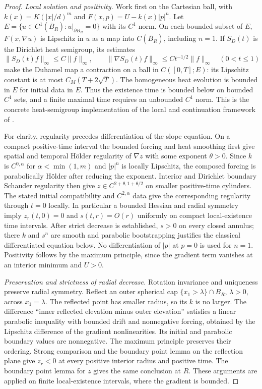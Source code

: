 \documentclass[11pt,a4paper]{article}
\theoremstyle{definition}\newtheorem{definition}[theorem]{Definition}
\theoremstyle{remark}\newtheorem{remark}[theorem]{Remark}
\newcommand{\cl}{\overline}
\begin{document}
\begin{proof}
\emph{Local solution and positivity.} Work first on the Cartesian ball, with $k(x)=K(|x|/d)^m$ and
$F(x,p)=U-k(x)|p|^n$. Let $E=\{u\in C^1(\cl B_R):u|_{\partial B_R}=0\}$
with its $C^1$ norm. On each bounded subset of $E$, $F(x,\nabla u)$ is
Lipschitz in $u$ as a map into $C(\cl B_R)$, including $n=1$.
If $S_D(t)$ is the Dirichlet heat semigroup, its estimates
\[
 \|S_D(t)f\|_\infty\leq C\|f\|_\infty,\qquad
 \|\nabla S_D(t)f\|_\infty\leq C t^{-1/2}\|f\|_\infty
 \quad(0<t\leq1)
\]
make the Duhamel map a contraction on a ball in $C([0,T];E)$:
its Lipschitz constant is at most $C_M(T+2\sqrt T)$.
The homogeneous heat evolution is bounded in $E$ for initial data in $E$.
Thus the existence time is bounded below on bounded $C^1$ sets,
and a finite maximal time requires an unbounded $C^1$ norm.
This is the concrete heat-semigroup implementation of the local and
continuation framework of \cite[Section 3.3]{Henry}.

For clarity, regularity precedes differentiation of the slope equation.
On a compact positive-time interval the bounded forcing and heat smoothing
first give spatial and temporal H\"older regularity of $\nabla z$ with
some exponent $\theta>0$. Since $k$ is $C^{0,\alpha}$ for
$\alpha<\min(1,m)$ and $|p|^n$ is locally Lipschitz, the composed forcing
is parabolically H\"older after reducing the exponent. Interior and
Dirichlet boundary Schauder regularity then give $z\in C^{2+\theta,1+\theta/2}$
on smaller positive-time cylinders. The stated initial compatibility and
$C^{2,\alpha}$ data give the corresponding regularity through $t=0$ locally.
In particular a bounded Hessian and radial symmetry imply $z_r(t,0)=0$
and $s(t,r)=O(r)$ uniformly on compact local-existence time intervals.
After strict decrease is established, $s>0$ on every closed annulus;
there $k$ and $s^n$ are smooth and parabolic bootstrapping justifies the
classical differentiated equation below. No differentiation of $|p|$
at $p=0$ is used for $n=1$. Positivity follows by the maximum principle,
since the gradient term vanishes at an interior minimum and $U>0$.

\emph{Preservation and strictness of radial decrease.} Rotation invariance and uniqueness preserve radial symmetry. Reflect an outer spherical cap $\{x_1>\lambda\}\cap B_R$, $\lambda>0$, across $x_1=\lambda$. The reflected point has smaller radius, so its $k$ is no larger. The difference ``inner reflected elevation minus outer elevation'' satisfies a linear parabolic inequality with bounded drift and nonnegative forcing, obtained by the Lipschitz difference of the gradient nonlinearities. Its initial and parabolic boundary values are nonnegative. The maximum principle preserves their ordering. Strong comparison and the boundary point lemma on the reflection plane give $z_r<0$ at every positive interior radius and positive time. The boundary point lemma for $z$ gives the same conclusion at $R$. These arguments are applied on finite local-existence intervals, where the gradient is bounded.


\end{proof}
\end{document}

